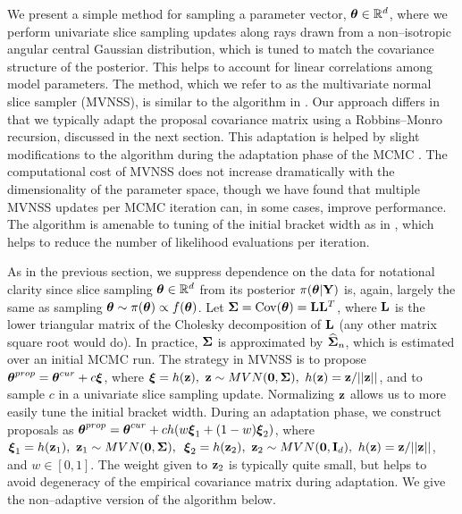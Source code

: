 We present a simple method for sampling a parameter vector, $ \boldsymbol{\theta}\in\mathbb{R}^d $, where we perform univariate slice sampling updates along rays drawn from a non--isotropic angular central Gaussian distribution, which is tuned to match the covariance structure of the posterior. This helps to account for linear correlations among model parameters. The method, which we refer to as the multivariate normal slice sampler (MVNSS), is similar to the algorithm in \cite{ahmadian2011efficient}. Our approach differs in that we typically adapt the proposal covariance matrix using a Robbins--Monro recursion, discussed in the next section. This adaptation is helped by slight modifications to the algorithm during the adaptation phase of the MCMC \cite{andrieu2008tutorial,liang2011advanced}. The computational cost of MVNSS does not increase dramatically with the dimensionality of the parameter space, though we have found that multiple MVNSS updates per MCMC iteration can, in some cases, improve performance. The algorithm is amenable to tuning of the initial bracket width as in \cite{tibbits2014automated}, which helps to reduce the number of likelihood evaluations per iteration.

As in the previous section, we suppress dependence on the data for notational clarity since slice sampling $ \boldsymbol{\theta}\in\mathbb{R}^d $ from its posterior $ \pi(\boldsymbol{\theta}|\mathbf{Y}) $ is, again, largely the same as sampling $ \boldsymbol{\theta} \sim \pi(\boldsymbol{\theta})\propto f(\boldsymbol{\theta})$. Let $ \boldsymbol{\Sigma} = \mathrm{Cov}(\boldsymbol{\theta}) = \mathbf{L}\mathbf{L}^T $, where $ \mathbf{L} $ is the lower triangular matrix of the Cholesky decomposition of $ \mathbf{L} $ (any other matrix square root would do). In practice, $ \boldsymbol{\Sigma} $ is approximated by $ \widehat{\boldsymbol{\Sigma}}_n $, which is estimated over an initial MCMC run. The strategy in MVNSS is to propose $ \boldsymbol{\theta}^{prop} = \boldsymbol{\theta}^{cur} + c\boldsymbol{\xi} $, where $ \boldsymbol{\xi} = h(\mathbf{z}),\ \mathbf{z}\sim MVN(\mathbf{0},\boldsymbol{\Sigma}),\ h(\mathbf{z}) = \mathbf{z} / ||\mathbf{z}|| $, and to sample $ c $ in a univariate slice sampling update. Normalizing $ \mathbf{z} $ allows us to more easily tune the initial bracket width. During an adaptation phase, we construct proposals as $ \boldsymbol{\theta}^{prop} = \boldsymbol{\theta}^{cur} + ch(w\boldsymbol{\xi}_1 + (1-w)\boldsymbol{\xi}_2) $, where $ \boldsymbol{\xi}_1 = h(\mathbf{z}_1),\ \mathbf{z}_1\sim MVN(\mathbf{0},\boldsymbol{\Sigma}),\,\ \boldsymbol{\xi}_2 = h(\mathbf{z}_2),\ \mathbf{z}_2\sim MVN(\mathbf{0}, \mathbf{I}_d), \ h(\mathbf{z}) = \mathbf{z} / ||\mathbf{z}|| $, and $ w\in[0,1] $. The weight given to $ \mathbf{z}_2 $ is typically quite small, but helps to avoid degeneracy of the empirical covariance matrix during adaptation. We give the non--adaptive version of the algorithm below. 


